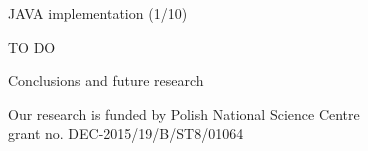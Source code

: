 \documentclass[c]{beamer}
\begin{document}

\begin{frame}{JAVA implementation (1/10)}

TO DO

\end{frame}

\begin{frame}{Conclusions and future research}


Our research is funded by Polish National Science Centre \\ grant no. DEC-2015/19/B/ST8/01064

\end{frame}

\end{document}
